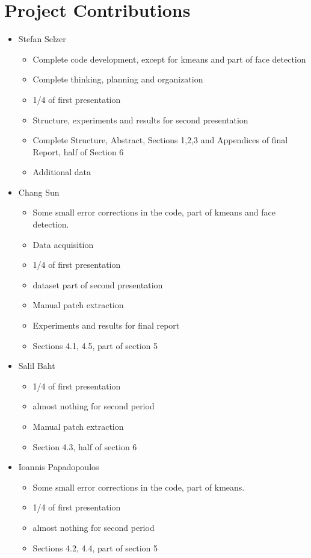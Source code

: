 \section{Project Contributions}

\begin{itemize}
	\item Stefan Selzer
	\begin{itemize}
	\item Complete code development, except for kmeans and part of face detection
	\item Complete thinking, planning and organization
	\item 1/4 of first presentation
	\item Structure, experiments and results for second presentation
	\item Complete Structure, Abstract, Sections 1,2,3 and Appendices of final Report, half of Section 6
	\item Additional data
	\end{itemize}
	\item Chang Sun
	\begin{itemize}
	\item Some small error corrections in the code, part of kmeans and face detection.
	\item Data acquisition
	\item 1/4 of first presentation
	\item dataset part of second presentation
	\item Manual patch extraction
	\item Experiments and results for final report
	\item Sections 4.1, 4.5, part of section 5
	\end{itemize}
	\item Salil Baht
	\begin{itemize}
	\item 1/4 of first presentation
	\item almost nothing for second period
	\item Manual patch extraction
	\item Section 4.3, half of section 6 
	\end{itemize}
	\item Ioannis Papadopoulos
	\begin{itemize}
	\item Some small error corrections in the code, part of kmeans.
	\item 1/4 of first presentation
	\item almost nothing for second period
	\item Sections 4.2, 4.4, part of section 5
	\end{itemize}
\end{itemize}